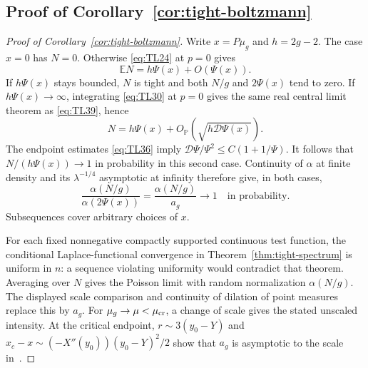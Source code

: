 \subsection{Proof of Corollary~\ref{cor:tight-boltzmann}}\label{subsec:tight-boltzmann-proof}

\begin{proof}[Proof of Corollary~\ref{cor:tight-boltzmann}]
Write $x=P\mu_g$ and $h=2g-2$. The case $x=0$ has $N=0$.
Otherwise \eqref{eq:TL24} at $p=0$ gives
\[
 \mathbb E N=h\Psi(x)+O(\Psi(x)).
\]
If $h\Psi(x)$ stays bounded, $N$ is tight and both $N/g$ and
$2\Psi(x)$ tend to zero. If $h\Psi(x)\to\infty$, integrating
\eqref{eq:TL30} at $p=0$ gives the same real central limit theorem
as \eqref{eq:TL39}, hence
\[
 N=h\Psi(x)+O_{\mathbb P}\!\left(\sqrt{h\mathscr D\Psi(x)}\right).
\]
The endpoint estimates \eqref{eq:TL36} imply
$\mathscr D\Psi/\Psi^2\le C(1+1/\Psi)$. It follows that
$N/(h\Psi(x))\to1$ in probability in this second case.
Continuity of $\alpha$ at finite density and its
$\lambda^{-1/4}$ asymptotic at infinity therefore give, in both cases,
\[
 \frac{\alpha(N/g)}{\alpha(2\Psi(x))}
 =\frac{\alpha(N/g)}{a_g}\longrightarrow1
 \quad\text{in probability}.
\]
Subsequences cover arbitrary choices of $x$.

For each fixed nonnegative compactly supported continuous test function,
the conditional Laplace-functional convergence in
Theorem~\ref{thm:tight-spectrum} is uniform in $n$: a sequence violating
uniformity would contradict that theorem. Averaging over $N$ gives the
Poisson limit with random normalization $\alpha(N/g)$.
The displayed scale comparison and continuity of dilation of point
measures replace this by $a_g$. For $\mu_g\to\mu<\mu_{\rm cr}$, a change of
scale gives the stated unscaled intensity. At the critical endpoint,
$r\sim3(y_0-Y)$ and $x_c-x\sim(-X''(y_0))(y_0-Y)^2/2$ show that
$a_g$ is asymptotic to the scale in~\cite[Theorem~1.2]{BL}.
\end{proof}
